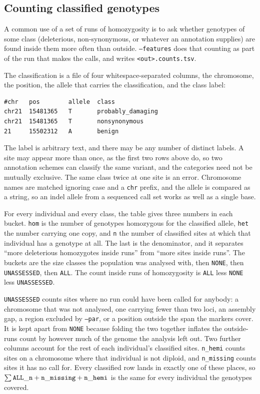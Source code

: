 \documentclass[12pt]{article}%
\begin{document}
\subsection{Counting classified genotypes}
\label{sec:features}

\noindent A common use of a set of runs of homozygosity is to ask whether
genotypes of some class (deleterious, non-synonymous, or whatever an annotation
supplies) are found inside them more often than outside.  {\tt --features}
does that counting as part of the run that makes the calls, and writes
{\tt <out>.counts.tsv}.

The classification is a file of four whitespace-separated columns, the
chromosome, the position, the allele that carries the classification, and the
class label:

\begin{lstlisting}
#chr   pos        allele  class
chr21  15481365   T       probably_damaging
chr21  15481365   T       nonsynonymous
21     15502312   A       benign
\end{lstlisting}

\noindent The label is arbitrary text, and there may be any number of distinct
labels.  A site may appear more than once, as the first two rows above do, so
two annotation schemes can classify the same variant, and the categories need
not be mutually exclusive.  The same class twice at one site is an error.
Chromosome names are matched ignoring case and a {\tt chr} prefix, and the
allele is compared as a string, so an indel allele from a sequenced call set
works as well as a single base.

For every individual and every class, the table gives three numbers in each
bucket.  {\tt hom} is the number of genotypes homozygous for the classified
allele, {\tt het} the number carrying one copy, and {\tt n} the number of
classified sites at which that individual has a genotype at all.  The last is
the denominator, and it separates ``more deleterious homozygotes inside runs''
from ``more sites inside runs''.  The buckets are the size classes the
population was analysed with, then {\tt NONE}, then {\tt UNASSESSED}, then
{\tt ALL}.  The count inside runs of homozygosity is {\tt ALL} less
{\tt NONE} less {\tt UNASSESSED}.

{\tt UNASSESSED} counts sites where no run could have been called for anybody:
a chromosome that was not analysed, one carrying fewer than two loci, an
assembly gap, a region excluded by {\tt --par}, or a position outside the span
the markers cover.  It is kept apart from {\tt NONE} because folding the two
together inflates the outside-runs count by however much of the genome the
analysis left out.  Two further columns account for the rest of each
individual's classified sites.  {\tt n\_hemi} counts sites on a chromosome
where that individual is not diploid, and {\tt n\_missing} counts sites it has
no call for.  Every classified row lands in exactly one of these places, so
$\sum {\tt ALL\_n} + {\tt n\_missing} + {\tt n\_hemi}$ is the same for every
individual the genotypes covered.
\end{document}
